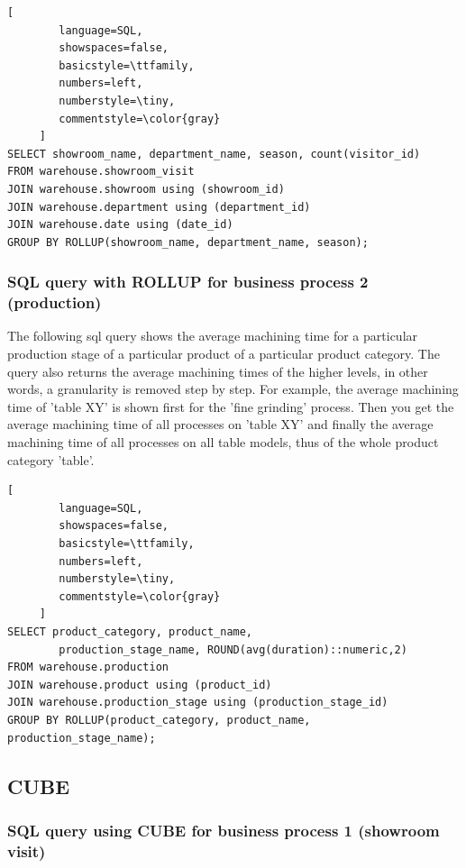 \documentclass[letterpaper,12pt]{article}
\begin{document}
\begin{lstlisting}[
        language=SQL,
        showspaces=false,
        basicstyle=\ttfamily,
        numbers=left,
        numberstyle=\tiny,
        commentstyle=\color{gray}
     ]
SELECT showroom_name, department_name, season, count(visitor_id)
FROM warehouse.showroom_visit
JOIN warehouse.showroom using (showroom_id)
JOIN warehouse.department using (department_id)
JOIN warehouse.date using (date_id)
GROUP BY ROLLUP(showroom_name, department_name, season);
\end{lstlisting}

\subsubsection{SQL query with ROLLUP for business process 2 (production)}

The following sql query shows the average machining time for a particular production stage of a particular product of a particular product category. The query also returns the average machining times of the higher levels, in other words, a granularity is removed step by step. For example, the average machining time of 'table XY' is shown first for the 'fine grinding' process. Then you get the average machining time of all processes on 'table XY' and finally the average machining time of all processes on all table models, thus of the whole product category 'table'.

\begin{lstlisting}[
        language=SQL,
        showspaces=false,
        basicstyle=\ttfamily,
        numbers=left,
        numberstyle=\tiny,
        commentstyle=\color{gray}
     ]
SELECT product_category, product_name, 
        production_stage_name, ROUND(avg(duration)::numeric,2)
FROM warehouse.production
JOIN warehouse.product using (product_id)
JOIN warehouse.production_stage using (production_stage_id)
GROUP BY ROLLUP(product_category, product_name, production_stage_name);
\end{lstlisting}    

\subsection{CUBE}

\subsubsection{SQL query using CUBE for business process 1 (showroom visit)}
\end{document}
